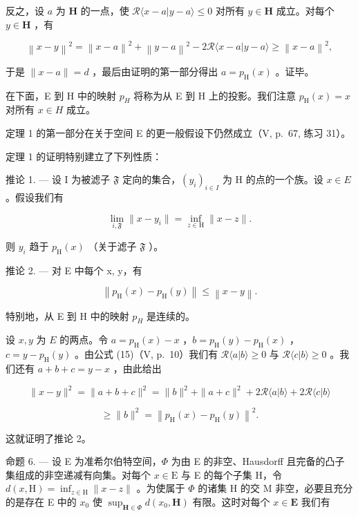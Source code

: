 反之，设 \(a\) 为 \(\mathbf{H}\) 的一点，使 \(\mathcal{R}\langle x - a|y - a\rangle \leqslant 0\) 对所有 \(y\in \mathbf{H}\) 成立。对每个 \(y\in \mathbf{H}\) ，有

\[
\left\| x - y \right\| ^ {2} = \left\| x - a \right\| ^ {2} + \left\| y - a \right\| ^ {2} - 2 \mathcal {R} \langle x - a | y - a \rangle \geqslant \left\| x - a \right\| ^ {2},
\]

于是 \(\| x - a\| = d\) ，最后由证明的第一部分得出 \(a = p_{\mathrm{H}}(x)\) 。证毕。

在下面，E 到 H 中的映射 \(p_{H}\) 将称为从 E 到 H 上的投影。我们注意 \(p_{\mathrm{H}}(x)=x\) 对所有 \(x\in H\) 成立。

定理 1 的第一部分在关于空间 E 的更一般假设下仍然成立（V, p.~67, 练习 31）。

定理 1 的证明特别建立了下列性质：

推论 1. --- 设 I 为被滤子 \(\mathfrak{F}\) 定向的集合，\((y_i)_{i\in I}\) 为 H 的点的一个族。设 \(x\in E\) 。假设我们有

\[
\lim _ {i, \mathfrak {F}} \| x - y _ {i} \| = \inf _ {z \in \mathrm{H}} \| x - z \|.
\]

则 \(y_{i}\) 趋于 \(p_{\mathrm{H}}(x)\) （关于滤子 \(\mathfrak{F}\) ）。

推论 2. --- 对 E 中每个 x, y，有

\[
\left\| p _ {\mathrm{H}} (x) - p _ {\mathrm{H}} (y) \right\| \leqslant \left\| x - y \right\|.
\]

特别地，从 E 到 H 中的映射 \(p_{H}\) 是连续的。

设 \(x, y\) 为 \(E\) 的两点。令 \(a = p_{\mathrm{H}}(x) - x\) ，\(b = p_{\mathrm{H}}(y) - p_{\mathrm{H}}(x)\) ，\(c = y - p_{\mathrm{H}}(y)\) 。由公式 (15)（V, p.~10）我们有 \(\mathcal{R}\langle a|b\rangle \geqslant 0\) 与 \(\mathcal{R}\langle c|b\rangle \geqslant 0\) 。我们还有 \(a + b + c = y - x\) ，由此给出

\[
\| x - y \| ^ {2} = \| a + b + c \| ^ {2} = \| b \| ^ {2} + \| a + c \| ^ {2} + 2 \mathscr {R} \langle a | b \rangle + 2 \mathscr {R} \langle c | b \rangle
\]

\[
\geqslant \| b \| ^ {2} = \left\| p _ {\mathrm{H}} (x) - p _ {\mathrm{H}} (y) \right\| ^ {2}.
\]

这就证明了推论 2。

命题 6. --- 设 E 为准希尔伯特空间，\(\Phi\) 为由 E 的非空、Hausdorff 且完备的凸子集组成的非空递减有向集。对每个 \(x \in \mathrm{E}\) 与 E 的每个子集 H，令 \(d(x, \mathrm{H}) = \inf_{z \in \mathrm{H}} \| x - z \|\) 。为使属于 \(\Phi\) 的诸集 H 的交 M 非空，必要且充分的是存在 E 中的 \(x_0\) 使 \(\sup_{\mathbf{H} \in \Phi} d(x_0, \mathbf{H})\) 有限。这时对每个 \(x \in \mathbf{E}\) 我们有

